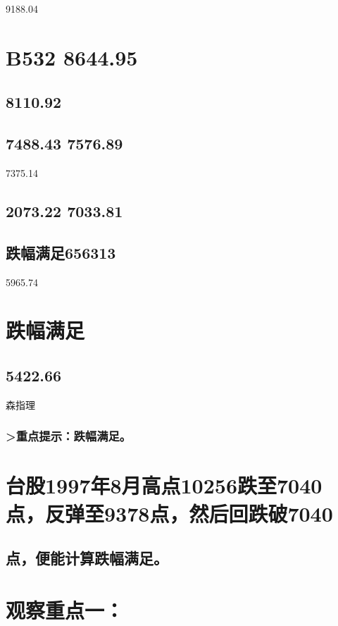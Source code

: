 \documentclass{article}
\begin{document}
9188.04

\section{B532 8644.95}

\subsection{8110.92}

\subsection{7488.43 7576.89}

7375.14

\subsection{2073.22 7033.81}

\subsection{跌幅满足656313}

5965.74

\section{跌幅满足}

\subsection{5422.66}

森指理

\subsubsection{>重点提示：跌幅满足。}

\section{台股1997年8月高点10256跌至7040点，反弹至9378点，然后回跌破7040}

\subsection{点，便能计算跌幅满足。}

\section{观察重点一：}
\end{document}
